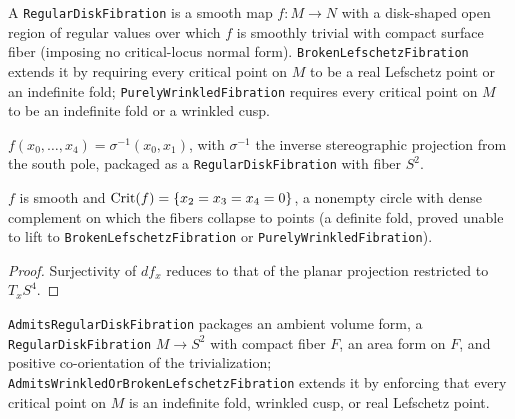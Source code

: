 \begin{definition}
\label{def_wrinkled}
\leanok
{}
A \texttt{RegularDiskFibration} is a smooth map $f\colon M\to N$ with a disk-shaped open region of
regular values over which $f$ is smoothly trivial with compact surface fiber (imposing no
critical-locus normal form). \texttt{BrokenLefschetzFibration} extends it by requiring every
critical point on $M$ to be a real Lefschetz point or an indefinite fold;
\texttt{PurelyWrinkledFibration} requires every critical point on $M$ to be an indefinite fold or a
wrinkled cusp.
\end{definition}

\begin{definition}
\label{def_s4_fibration}
\leanok
{}
$f(x_0,\dots,x_4)=\sigma^{-1}(x_0,x_1)$, with $\sigma^{-1}$ the inverse stereographic projection
from the south pole, packaged as a \texttt{RegularDiskFibration} with fiber $S^2$.
\end{definition}

\begin{lemma}
\label{lem_s4_crit}
\leanok
{}
$f$ is smooth and $\mathrm{Crit}(f)=\{x_2=x_3=x_4=0\}$, a nonempty circle with dense complement on which
the fibers collapse to points (a definite fold, proved unable to lift to
\texttt{BrokenLefschetzFibration} or \texttt{PurelyWrinkledFibration}).
\end{lemma}
\begin{proof}\leanok
Surjectivity of $df_x$ reduces to that of the planar projection restricted to $T_xS^4$.
\end{proof}

\begin{definition}
\label{def_admits}
\leanok
{}
\texttt{AdmitsRegularDiskFibration} packages an ambient volume form, a
\texttt{RegularDiskFibration} $M\to S^2$ with compact fiber $F$, an area form on $F$, and positive
co-orientation of the trivialization; \texttt{AdmitsWrinkledOrBrokenLefschetzFibration} extends it
by enforcing that every critical point on $M$ is an indefinite fold, wrinkled cusp, or real
Lefschetz point.
\end{definition}

